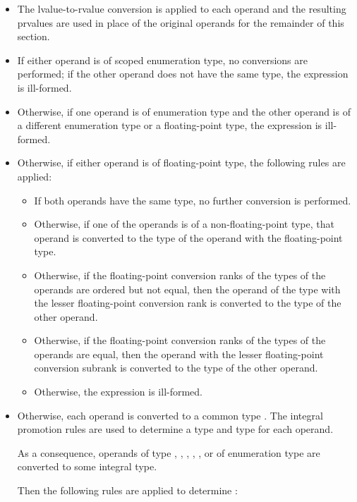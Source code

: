 \begin{itemize}
\item The lvalue-to-rvalue conversion
is applied to each operand and
the resulting prvalues are used in place of the original operands
for the remainder of this section.
\item If either operand is of scoped enumeration type, no conversions
are performed; if the other operand does not have the same type, the expression is
ill-formed.
\item Otherwise, if one operand is of enumeration type and the other operand is
of a different enumeration type or a floating-point type, the expression is
ill-formed.
\item Otherwise, if either operand is of floating-point type,
the following rules are applied:
\begin{itemize}
\item
If both operands have the same type, no further conversion is performed.
\item
Otherwise, if one of the operands is of a non-floating-point type,
that operand is converted to the type of
the operand with the floating-point type.
\item
Otherwise, if the floating-point conversion ranks of
the types of the operands are ordered but not equal,
then the operand of the type with the lesser floating-point conversion rank
is converted to the type of the other operand.
\item
Otherwise, if the floating-point conversion ranks of the types of
the operands are equal,
then the operand with the lesser floating-point conversion subrank
is converted to the type of the other operand.
\item
Otherwise, the expression is ill-formed.
\end{itemize}
\item Otherwise, each operand is converted to a common type .
The integral promotion rules are used
to determine a type  and type  for each operand.
\begin{footnote}
As a consequence, operands of type , , ,
, , or of enumeration type are converted
to some integral type.
\end{footnote}
Then the following rules are applied to determine :

\begin{itemize}


\end{itemize}
\end{itemize}
